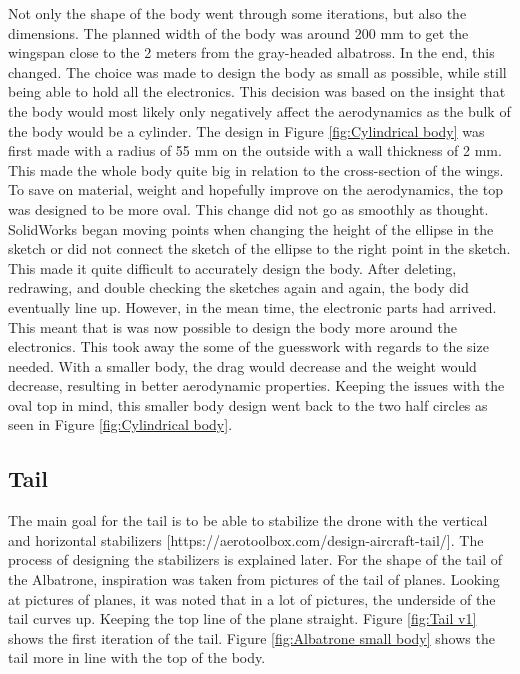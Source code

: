Not only the shape of the body went through some iterations, but also the dimensions. The planned width of the body was around 200 mm to get the wingspan close to the 2 meters from the gray-headed albatross. In the end, this changed. The choice was made to design the body as small as possible, while still being able to hold all the electronics. This decision was based on the insight that the body would most likely only negatively affect the aerodynamics as the bulk of the body would be a cylinder. The design in Figure \ref{fig:Cylindrical body} was first made with a radius of 55 mm on the outside with a wall thickness of 2 mm. This made the whole body quite big in relation to the cross-section of the wings. To save on material, weight and hopefully improve on the aerodynamics, the top was designed to be more oval. This change did not go as smoothly as thought. SolidWorks began moving points when changing the height of the ellipse in the sketch or did not connect the sketch of the ellipse to the right point in the sketch. This made it quite difficult to accurately design the body. After deleting, redrawing, and double checking the sketches again and again, the body did eventually line up. However, in the mean time, the electronic parts had arrived. This meant that is was now possible to design the body more around the electronics. This took away the some of the guesswork with regards to the size needed. With a smaller body, the drag would decrease and the weight would decrease, resulting in better aerodynamic properties. Keeping the issues with the oval top in mind, this smaller body design went back to the two half circles as seen in Figure \ref{fig:Cylindrical body}.

\subsection{Tail} 
The main goal for the tail is to be able to stabilize the drone with the vertical and horizontal stabilizers [https://aerotoolbox.com/design-aircraft-tail/]. The process of designing the stabilizers is explained later. For the shape of the tail of the Albatrone, inspiration was taken from pictures of the tail of planes. Looking at pictures of planes, it was noted that in a lot of pictures, the underside of the tail curves up. Keeping the top line of the plane straight. Figure \ref{fig:Tail v1} shows the first iteration of the tail. Figure \ref{fig:Albatrone small body} shows the tail more in line with the top of the body.\\

